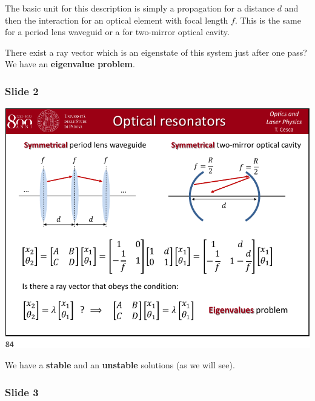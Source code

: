 \documentclass[../main/main.tex]{subfiles}
\begin{document}
The basic unit for this description is simply a propagation for a distance \( d \) and then the interaction for an optical element with focal length \( f \). This is the same for a period lens waveguid or a for two-mirror optical cavity.

There exist a ray vector which is an eigenstate of this system just after one pass? We have an \textbf{eigenvalue problem}.

\subsubsection*{Slide 2}

\begin{minipage}[]{0.5\linewidth}
\centering
\includegraphics[page=2,width=1\textwidth]{../lessons/pdf_file/21_lecture.pdf}
\end{minipage}
\hspace{0.3cm}\vspace{0.3cm}
\begin{minipage}[c]{0.47\linewidth}

We have a \textbf{stable} and an \textbf{unstable} solutions (as we will see).

\end{minipage}

\subsubsection*{Slide 3}
\end{document}
